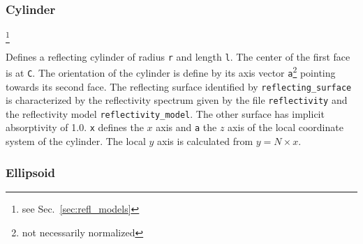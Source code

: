 \documentclass[10pt,a4paper,titlepage]{article}
\begin{document}
\subsubsection{Cylinder}








\footnote{see Sec.~\ref{sec:refl_models}}


\vspace{0.25cm}
Defines a reflecting cylinder of radius {\tt r} and length {\tt l}. The center of the first face is at {\tt C}. The orientation of the cylinder is define by its axis vector {\tt a}\footnote{not necessarily normalized} pointing towards its second face. The reflecting surface identified by {\tt reflecting\_surface} is characterized by the reflectivity spectrum given by the file {\tt reflectivity} and the reflectivity model {\tt reflectivity\_model}. The other surface has implicit absorptivity of 1.0. {\tt x} defines the $x$ axis and {\tt a} the $z$ axis of the local coordinate system of the cylinder. The local $y$ axis is calculated from $y = N \times x$.

\subsubsection{Ellipsoid}









\end{document}
